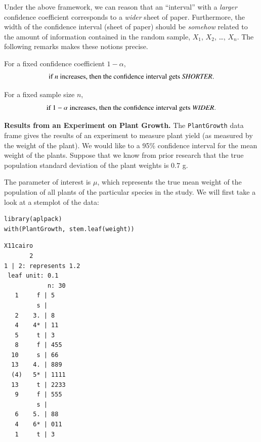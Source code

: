 \documentclass[captions=tableheading]{scrbook}
\begin{document}
Under the above framework, we can reason that an ``interval'' with a \emph{larger} confidence coefficient corresponds to a \emph{wider} sheet of paper. Furthermore, the width of the confidence interval (sheet of paper) should be \emph{somehow} related to the amount of information contained in the random sample, \(X_{1}\), \(X_{2}\), \ldots{},
\(X_{n}\). The following remarks makes these notions precise. 

\begin{rem}
For a fixed confidence coefficient \(1-\alpha\),
\begin{equation}
\mbox{if }n\mbox{ increases, then the confidence interval gets \emph{SHORTER}.}
\end{equation}
\end{rem}

\begin{rem}
For a fixed sample size \(n\),
\begin{equation}
\mbox{if }1-\alpha\mbox{ increases, then the confidence interval gets \emph{WIDER}.}
\end{equation}
\end{rem}


\begin{example}
\label{exa:plant-one-samp-z-int}
\textbf{Results from an Experiment on Plant Growth.} The \texttt{PlantGrowth} data frame gives the results of an experiment to measure plant yield (as measured by the weight of the plant). We would like to a 95\% confidence interval for the mean weight of the plants. Suppose that we know from prior research that the true population standard deviation of the plant weights is \(0.7\) g.

The parameter of interest is \(\mu\), which represents the true mean weight of the population of all plants of the particular species in the study. We will first take a look at a stemplot of the data:

\end{example}


\begin{verbatim}
library(aplpack)
with(PlantGrowth, stem.leaf(weight))
\end{verbatim}


\begin{verbatim}
X11cairo 
       2
1 | 2: represents 1.2
 leaf unit: 0.1
            n: 30
   1     f | 5
         s | 
   2    3. | 8
   4    4* | 11
   5     t | 3
   8     f | 455
  10     s | 66
  13    4. | 889
  (4)   5* | 1111
  13     t | 2233
   9     f | 555
         s | 
   6    5. | 88
   4    6* | 011
   1     t | 3
\end{verbatim}
\end{document}
